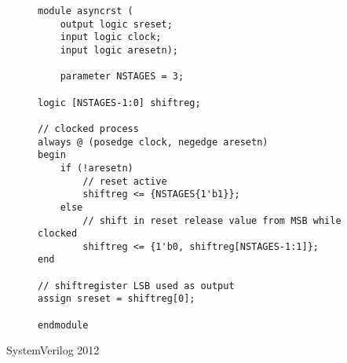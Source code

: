 \begin{center}
    \begin{figure}[h]
        \begin{verbatim}
module asyncrst (
    output logic sreset;
    input logic clock;
    input logic aresetn);

    parameter NSTAGES = 3;

logic [NSTAGES-1:0] shiftreg;

// clocked process
always @ (posedge clock, negedge aresetn)
begin
    if (!aresetn)
        // reset active
        shiftreg <= {NSTAGES{1'b1}};
    else
        // shift in reset release value from MSB while clocked
        shiftreg <= {1'b0, shiftreg[NSTAGES-1:1]};
end

// shiftregister LSB used as output
assign sreset = shiftreg[0];

endmodule
        \end{verbatim}
    \end{figure}
    SystemVerilog 2012
\end{center}
